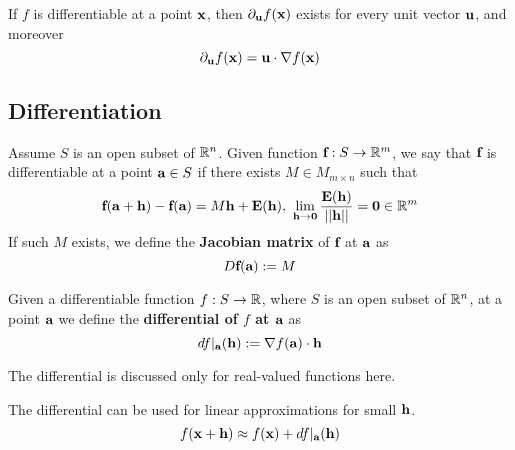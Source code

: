 \documentclass[11pt]{article}
\newcommand{\vef}[0]{\ve{f}}
\begin{document}
				\begin{theorem}
					If $f$ is differentiable at a point $\textbf{x}$, then $\partial_{\textbf{u}} f(\textbf{x})$ exists for every unit vector $\textbf{u}$, and moreover
					\begin{equation}
						\partial_{\textbf{u}} f(\textbf{x}) = \textbf{u} \cdot \nabla f(\textbf{x})
					\end{equation}
				\end{theorem}
		
		\subsection{Differentiation}
			\begin{definition}
				Assume $S$ is an open subset of $\mathbb{R}^n$. Given function $\vef: S \to \R^m$, we say that $\textbf{f}$ is differentiable at a point $\textbf{a} \in S$ if there exists $M \in M_{m \times n}$ such that
				\begin{equation}
					\vef(\vea + \ve{h}) - \vef(\vea) = M \ve{h} + \ve{E}(\ve{h}),\ \lim_{\ve{h} \to \ve{0}} \frac{\ve{E}(\ve{h})}{\norm{\ve{h}}} = \ve{0} \in \R^m
				\end{equation}
				If such $M$ exists, we define the \textbf{Jacobian matrix} of $\vef$ at $\textbf{a}$ as 
				\begin{equation}
					D\vef(\vea) := M
				\end{equation}
			\end{definition}
			
			\begin{definition}
				Given a differentiable function $f: S \to \mathbb{R}$, where $S$ is an open subset of $\mathbb{R}^n$, at a point $\textbf{a}$ we define the \textbf{differential of $f$ at $\textbf{a}$} as 
				\begin{equation}
					df|_{\textbf{a}}(\textbf{h}) := \nabla f(\textbf{a}) \cdot \textbf{h}
				\end{equation}
			\end{definition}
			
			\begin{remark}
				The differential is discussed only for real-valued functions here.
			\end{remark}
			
			\begin{remark}
				The differential can be used for linear approximations for small $\textbf{h}$.
				\begin{equation}
					f(\textbf{x} + \textbf{h}) \approx f(\textbf{x}) + df|_{\textbf{a}}(\textbf{h})
				\end{equation}
			\end{remark}
			
\end{document}
